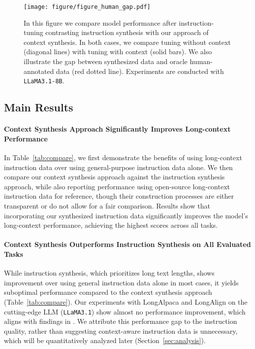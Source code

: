 \begin{figure*}[ht]
    \centering
    \texttt{[image: figure/figure\_human\_gap.pdf]}
    \caption{In this figure we compare model performance after instruction-tuning contrasting instruction synthesis with our approach of context synthesis. In both cases, we compare tuning without context (diagonal lines) with tuning with context (solid bars). We also illustrate the gap between synthesized data and oracle human-annotated data (red dotted line). Experiments are conducted with \texttt{LLaMA3.1-8B}.}
    \label{fig:human_gap}
\end{figure*}
\subsection{Main Results}
\label{sec:main}

\paragraph{Context Synthesis Approach Significantly Improves Long-context Performance}
In Table~\ref{tab:compare}, we first demonstrate the benefits of using long-context instruction data over using general-purpose instruction data alone.
We then compare our context synthesis approach against the instruction synthesis approach, while also reporting performance using open-source long-context instruction data for reference, though their construction processes are either transparent or do not allow for a fair comparison.
Results show that incorporating our synthesized instruction data significantly improves the model's long-context performance, achieving the highest scores across all tasks.

\noindent\paragraph{Context Synthesis Outperforms Instruction Synthesis on All Evaluated Tasks}
While instruction synthesis, which prioritizes long text lengths, shows improvement over using general instruction data alone in most cases, it yields suboptimal performance compared to the context synthesis approach (Table~\ref{tab:compare}).
Our experiments with LongAlpaca and LongAlign on the cutting-edge LLM (\texttt{LLaMA3.1}) show almost no performance improvement, which aligns with findings in \citet{gao2024train}.
We attribute this performance gap to the instruction quality, rather than suggesting context-aware instruction data is unnecessary, which will be quantitatively analyzed later (Section~\ref{sec:analysis}).


